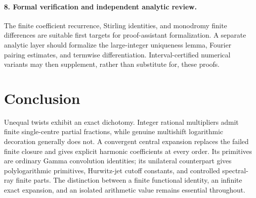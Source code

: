 \documentclass[11pt,a4paper]{article}
\numberwithin{equation}{section}
\theoremstyle{definition}\newtheorem{definition}[theorem]{Definition}
\theoremstyle{remark}\newtheorem{remark}[theorem]{Remark}
\begin{document}
\paragraph{8. Formal verification and independent analytic review.}
The finite coefficient recurrence, Stirling identities, and monodromy
finite differences are suitable first targets for proof-assistant
formalization. A separate analytic layer should formalize the
large-integer uniqueness lemma, Fourier pairing estimates, and
termwise differentiation. Interval-certified numerical variants may
then supplement, rather than substitute for, these proofs.

\section*{Conclusion}
Unequal twists exhibit an exact dichotomy. Integer rational multipliers
admit finite single-centre partial fractions, while genuine multishift
logarithmic decoration generally does not. A convergent central expansion
replaces the failed finite closure and gives explicit harmonic coefficients
at every order. Its primitives are ordinary Gamma convolution identities;
its unilateral counterpart gives polylogarithmic primitives, Hurwitz-jet
cutoff constants, and controlled spectral-ray finite parts. The distinction
between a finite functional identity, an infinite exact expansion, and an
isolated arithmetic value remains essential throughout.
\end{document}
